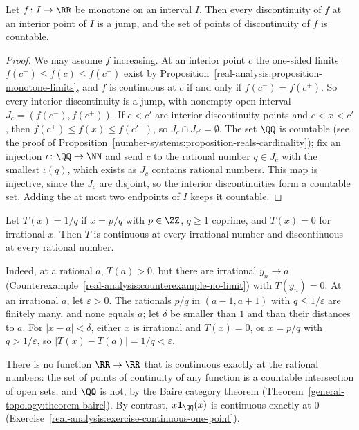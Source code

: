 \begin{theorem}\label{real-analysis:theorem-monotone-discontinuities}
Let $f \colon I \to \RR$ be monotone on an interval $I$. Then every discontinuity of $f$ at an interior point of $I$ is a jump, and the set of points of discontinuity of $f$ is countable.
\end{theorem}

\begin{proof}
We may assume $f$ increasing. At an interior point $c$ the one-sided limits $f(c^-) \leq f(c) \leq f(c^+)$ exist by Proposition~\ref{real-analysis:proposition-monotone-limits}, and $f$ is continuous at $c$ if and only if
$f(c^-) = f(c^+)$. So every interior discontinuity is a jump, with nonempty open interval $J_c = (f(c^-), f(c^+))$. If $c < c'$ are interior discontinuity points and $c < x < c'$, then
$f(c^+) \leq f(x) \leq f(c'^-)$, so $J_c \cap J_{c'} = \emptyset$. The set $\QQ$ is countable (see the proof of Proposition~\ref{number-systems:proposition-reals-cardinality}); fix an injection
$\iota \colon \QQ \to \NN$ and send $c$ to the rational number $q \in J_c$ with the smallest $\iota(q)$, which exists as $J_c$ contains rational numbers. This map is injective, since the $J_c$ are disjoint, so
the interior discontinuities form a countable set. Adding the at most two endpoints of $I$ keeps it countable.
\end{proof}

\begin{example}\label{real-analysis:example-thomae}
Let $T(x) = 1/q$ if $x = p/q$ with $p \in \ZZ$, $q \geq 1$ coprime, and $T(x) = 0$ for irrational $x$. Then $T$ is continuous at every irrational number and discontinuous at every rational number.

Indeed, at a rational $a$, $T(a) > 0$, but there are irrational $y_n \to a$ (Counterexample~\ref{real-analysis:counterexample-no-limit}) with $T(y_n) = 0$. At an irrational $a$, let $\varepsilon > 0$. The rationals
$p/q$ in $(a - 1, a + 1)$ with $q \leq 1/\varepsilon$ are finitely many, and none equals $a$; let $\delta$ be smaller than $1$ and than their distances to $a$. For $|x - a| < \delta$, either $x$ is irrational and $T(x) = 0$,
or $x = p/q$ with $q > 1/\varepsilon$, so $|T(x) - T(a)| = 1/q < \varepsilon$.
\end{example}

\begin{remark}\label{real-analysis:remark-continuity-set}
There is no function $\RR \to \RR$ that is continuous exactly at the rational numbers: the set of points of continuity of any function is a countable intersection of open sets, and $\QQ$ is not, by the
Baire category theorem (Theorem~\ref{general-topology:theorem-baire}). By contrast, $x\mathbf{1}_\QQ(x)$ is continuous exactly at $0$ (Exercise~\ref{real-analysis:exercise-continuous-one-point}).
\end{remark}


